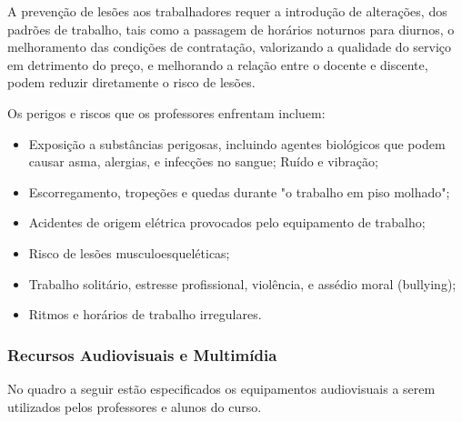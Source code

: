 A prevenção de lesões aos trabalhadores requer a introdução de alterações, dos padrões de trabalho, tais como a passagem de horários noturnos para diurnos, o melhoramento das condições de contratação, valorizando a qualidade do serviço em detrimento do preço, e melhorando a relação entre o docente e discente, podem reduzir diretamente o risco de les\~oes.

Os perigos e riscos que os professores enfrentam incluem:

\begin{itemize}
\item Exposição a substâncias perigosas, incluindo agentes biológicos que podem causar asma, alergias, e infecções no sangue;
Ruído e vibração;
\item Escorregamento, tropeções e quedas durante "o trabalho em piso molhado";
\item Acidentes de origem elétrica provocados pelo equipamento de trabalho;
\item Risco de lesões musculoesqueléticas;
\item Trabalho solitário, estresse profissional, violência, e assédio moral (bullying);
\item Ritmos e horários de trabalho irregulares.
\end{itemize}

\subsubsection{Recursos Audiovisuais e Multim\'idia}

No quadro a seguir estão especificados os equipamentos audiovisuais a serem utilizados pelos professores e alunos do curso.

